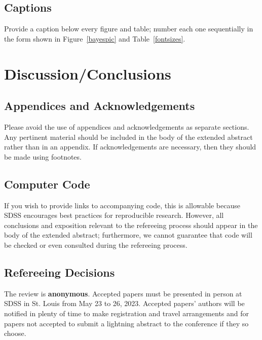 \documentclass[10pt]{article}
\begin{document}
\subsection{Captions}
Provide a caption below every figure and table; number each one
sequentially in the form shown in Figure~\ref{bayespic} and
Table~\ref{fontsizes}.

\section{Discussion/Conclusions}

\subsection{Appendices and Acknowledgements}

Please avoid the use of appendices and acknowledgements
as separate sections.  Any pertinent material should be included in the
body of the extended abstract rather than in an appendix.  If
acknowledgements are necessary, then they should be made using footnotes.

\subsection{Computer Code}

If you wish to provide links to accompanying code, this is allowable because
SDSS encourages best practices for reproducible research.  However, all
conclusions and exposition relevant to the refereeing process should appear in
the body of the extended abstract; furthermore, we cannot guarantee that
code will be checked or even consulted during the refereeing process.

\subsection{Refereeing Decisions}
The review is \textbf{anonymous}. Accepted papers must be presented in person at SDSS in St. Louis
from May 23 to 26, 2023.
Accepted papers' authors will be notified in plenty of time to make registration and travel
arrangements and for papers not accepted to submit a lightning abstract to the
conference if they so choose.


\end{document}
